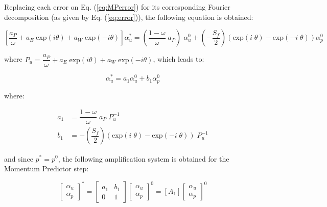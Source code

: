 \documentclass[final,3p,times,10pt,onecolumn]{myElsarticle}
\numberwithin{equation}{section}
\begin{document}
Replacing each error on Eq. (\ref{eq:MPerror}) for its corresponding Fourier decomposition (as given by Eq. (\ref{eq:error})), the following equation is obtained:

\begin{equation}
    \left[ \dfrac{a_P}{\omega}  + a_E \; \text{exp} (i \theta) + a_W \; \text{exp} (-i \theta) \right] \alpha_u^* = \left( \dfrac{1-\omega}{\omega} \; a_P \right) \; \alpha_u^0 + \left(- \dfrac{S_f}{2} \right) \left(\text{exp} \left(i \; \theta \right) -  \text{exp} \left(-i \; \theta \right) \right) \alpha_p^0
    \label{eq:MPfou}
\end{equation}

\noindent where $P_u = \dfrac{a_P}{\omega}  + a_E \; \text{exp} (i \theta) + a_W \; \text{exp} (-i \theta)$, which leads to:

\begin{equation}
     \alpha_u^* = a_1 \alpha_u^0 + b_1 \alpha_p^0
    \label{eq:MPfou2}
\end{equation}

\noindent where:

\begin{equation}
\begin{split}
     a_1 &= \dfrac{1-\omega}{\omega} \; a_P \; P_u^{-1} \\
     b_1 &= - \left( \dfrac{S_f}{2} \right) \left( \text{exp} \left(i \; \theta \right) -  \text{exp} \left(-i \; \theta \right) \right) \; P_u^{-1}
\end{split}
\end{equation}

\noindent and since $p^* = p^0$, the following amplification system is obtained for the Momentum Predictor step:

\begin{equation}
\begin{bmatrix}
\alpha_u \\
\alpha_p 
\end{bmatrix}^{*} =
\begin{bmatrix}
a_1 & b_1 \\
0 & 1
\end{bmatrix}
\begin{bmatrix}
\alpha_u \\
\alpha_p 
\end{bmatrix}^{0} =
[A_1]
\begin{bmatrix}
\alpha_u \\
\alpha_p 
\end{bmatrix}^{0}
\end{equation}
\end{document}
